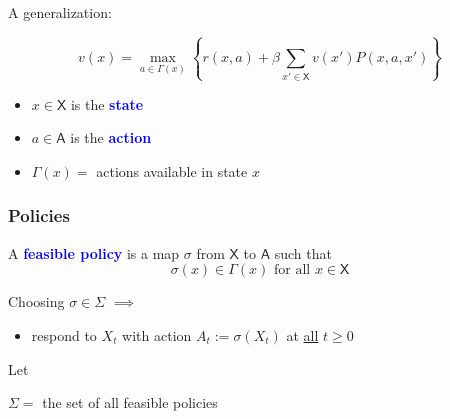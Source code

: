 \documentclass[xcolor=dvipsnames]{beamer}
\renewcommand{\geq}{\geqslant}
\newcommand{\navy}[1]{\textcolor{Blue}{\bf #1}}
\newcommand{\Asf}{\mathsf A}
\newcommand{\Xsf}{\mathsf X}
\renewcommand{\geq}{\geqslant}
\newcommand{\1}{\mathbbm 1}
\begin{document}
\begin{frame}

    A generalization:

    \begin{equation*}
            v(x)
            = \max_{a \in \Gamma(x)}
            \left\{
                r(x, a)
                + \beta
                \sum_{x' \in \Xsf} v(x') P(x, a, x')
            \right\}
    \end{equation*}
    \vspace{0.5em}
    \vspace{0.5em}

    \begin{itemize}
        \item $x \in \Xsf$ is the \navy{state}
        \item $a \in \Asf$ is the \navy{action}
        \item $\Gamma(x) =$ actions available in state $x$
    \end{itemize}


\end{frame}






\begin{frame}
    \frametitle{Policies}

    
    A \navy{feasible policy} is a map $\sigma$ from $\Xsf$ to $\Asf$ such that
    \begin{equation*}
            \sigma(x) \in \Gamma(x) \text{ for all } x \in \Xsf
    \end{equation*}

    Choosing $\sigma \in \Sigma$ $\implies$
    \begin{itemize}
        \item[] respond to $X_t$ with action $A_t := \sigma(X_t)$ at 
        \underline{all} $t \geq 0$
    \end{itemize}

    \vspace{0.5em}
    \vspace{0.5em}
    \vspace{0.5em}

    Let 
    \begin{center}
            $\Sigma = $ the set of all feasible policies
    \end{center}




\end{frame}
\end{document}
